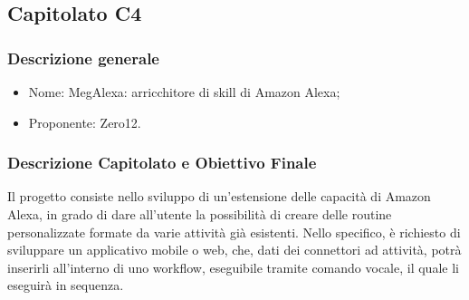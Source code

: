 \subsection{Capitolato C4}

\subsubsection{Descrizione generale}
\begin{itemize}
	\item Nome: MegAlexa: arricchitore di skill di Amazon Alexa;
	\item Proponente: Zero12.
\end{itemize}

\subsubsection{Descrizione Capitolato e Obiettivo Finale}
Il progetto consiste nello sviluppo di un'estensione delle capacità di Amazon Alexa, in grado di dare all'utente la possibilità di creare delle routine personalizzate formate da varie attività già esistenti.
Nello specifico, è richiesto di sviluppare un applicativo mobile o web, che, dati dei connettori ad attività, potrà inserirli all'interno di uno workflow, eseguibile tramite comando vocale, il quale li eseguirà in sequenza.

